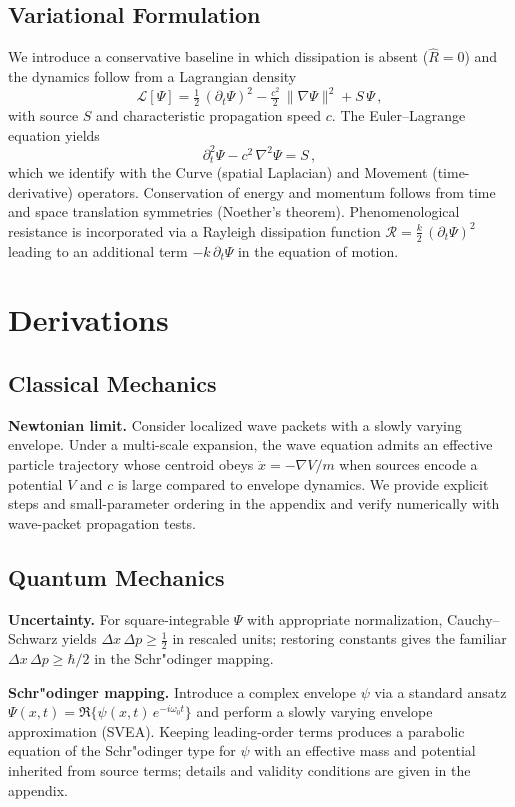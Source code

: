 \documentclass[12pt]{article}
\begin{document}
\subsection{Variational Formulation}
We introduce a conservative baseline in which dissipation is absent ($\hat R=0$) and the dynamics follow from a Lagrangian density
\begin{equation}
  \mathcal{L}[\Psi] = \tfrac{1}{2}\, (\partial_t \Psi)^2 - \tfrac{c^2}{2}\, \lVert\nabla \Psi\rVert^2 + S\,\Psi\, ,
\end{equation}
with source $S$ and characteristic propagation speed $c$. The Euler--Lagrange equation yields
\begin{equation}
  \partial_t^2 \Psi - c^2\,\nabla^2\Psi = S\, ,
\end{equation}
which we identify with the Curve (spatial Laplacian) and Movement (time-derivative) operators. Conservation of energy and momentum follows from time and space translation symmetries (Noether's theorem). Phenomenological resistance is incorporated via a Rayleigh dissipation function $\mathcal{R} = \tfrac{k}{2}\,(\partial_t\Psi)^2$ leading to an additional term $-k\,\partial_t\Psi$ in the equation of motion.

\section{Derivations}
\subsection{Classical Mechanics}
\textbf{Newtonian limit.} Consider localized wave packets with a slowly varying envelope. Under a multi-scale expansion, the wave equation admits an effective particle trajectory whose centroid obeys $\ddot x = -\nabla V/m$ when sources encode a potential $V$ and $c$ is large compared to envelope dynamics. We provide explicit steps and small-parameter ordering in the appendix and verify numerically with wave-packet propagation tests.
\subsection{Quantum Mechanics}
\textbf{Uncertainty.} For square-integrable $\Psi$ with appropriate normalization, Cauchy--Schwarz yields $\Delta x\, \Delta p \ge \tfrac{1}{2}$ in rescaled units; restoring constants gives the familiar $\Delta x\,\Delta p\ge \hbar/2$ in the Schr"odinger mapping.

\textbf{Schr"odinger mapping.} Introduce a complex envelope $\psi$ via a standard ansatz $\Psi(x,t)=\Re\{ \psi(x,t)\, e^{-i\omega_0 t} \}$ and perform a slowly varying envelope approximation (SVEA). Keeping leading-order terms produces a parabolic equation of the Schr"odinger type for $\psi$ with an effective mass and potential inherited from source terms; details and validity conditions are given in the appendix.
\end{document}
